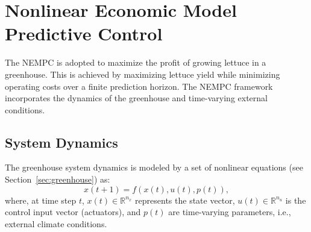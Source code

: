 \documentclass[conference]{IEEEtran}
\newcommand{\ui}[2]{#1_{\mathrm{#2}}}
\newcommand{\coo}{\ensuremath{\mathrm{CO_2}}}
\begin{document}









\section{Nonlinear Economic Model Predictive Control}\label{sec:mpc}
The NEMPC is adopted to maximize the profit of growing lettuce in a greenhouse. This is achieved by maximizing lettuce yield while minimizing operating costs over a finite prediction horizon. The NEMPC framework incorporates the dynamics of the greenhouse and time-varying external conditions.

\subsection{System Dynamics}\label{subsec:mpc_dynamics}

The greenhouse system dynamics is modeled by a set of nonlinear equations (see Section~\ref{sec:greenhouse}) as:
\begin{equation}
    x(t+1) = f\left( x(t), u(t), p(t) \right),
\end{equation}
where, at time step \(t\), \(x(t) \in \mathbb{R}^{n_x}\) represents the state vector, \(u(t) \in \mathbb{R}^{n_u}\) is the control input vector (actuators), and \(p(t)\) are time-varying parameters, i.e., external climate conditions.
\end{document}
